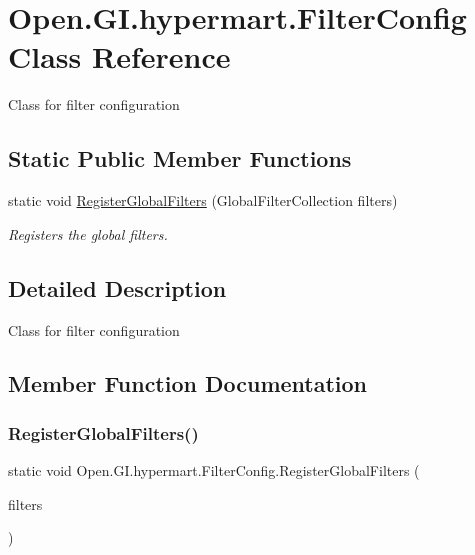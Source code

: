 \hypertarget{class_open_1_1_g_i_1_1hypermart_1_1_filter_config}{}\section{Open.\+G\+I.\+hypermart.\+Filter\+Config Class Reference}
\label{class_open_1_1_g_i_1_1hypermart_1_1_filter_config}


Class for filter configuration  


\subsection*{Static Public Member Functions}
\begin{DoxyCompactItemize}
\item 
static void \hyperlink{class_open_1_1_g_i_1_1hypermart_1_1_filter_config_a7c2f9e6d0e8157c2942a400ccff8134b}{Register\+Global\+Filters} (Global\+Filter\+Collection filters)
\begin{DoxyCompactList}\small\item\em Registers the global filters. \end{DoxyCompactList}\end{DoxyCompactItemize}


\subsection{Detailed Description}
Class for filter configuration 



\subsection{Member Function Documentation}
\hypertarget{class_open_1_1_g_i_1_1hypermart_1_1_filter_config_a7c2f9e6d0e8157c2942a400ccff8134b}{}\label{class_open_1_1_g_i_1_1hypermart_1_1_filter_config_a7c2f9e6d0e8157c2942a400ccff8134b} 
\subsubsection{\texorpdfstring{Register\+Global\+Filters()}{RegisterGlobalFilters()}}
{\footnotesize\ttfamily static void Open.\+G\+I.\+hypermart.\+Filter\+Config.\+Register\+Global\+Filters (\begin{DoxyParamCaption}\item[{Global\+Filter\+Collection}]{filters }\end{DoxyParamCaption})\hspace{0.3cm}{\ttfamily [static]}}



